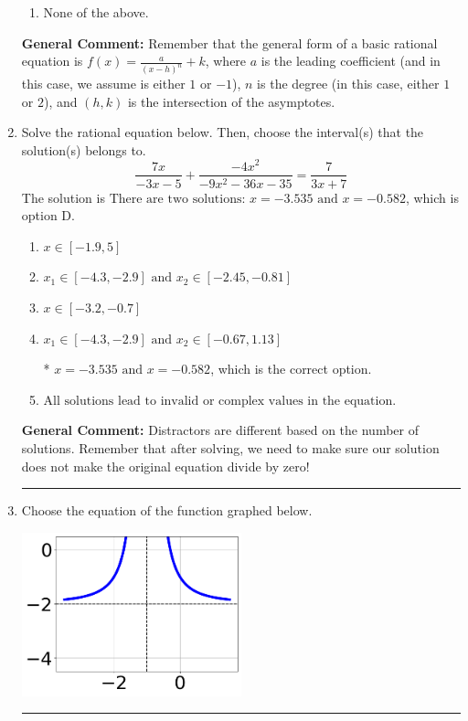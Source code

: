 \documentclass{extbook}[14pt]
\newcommand{\litem}[1]{\item #1

\rule{\textwidth}{0.4pt}}
\begin{document}
\begin{enumerate}
{\begin{enumerate}[label=\Alph*.]
\item None of the above.\end{enumerate}
\textbf{General Comment:} Remember that the general form of a basic rational equation is $ f(x) = \frac{a}{(x-h)^n} + k$, where $a$ is the leading coefficient (and in this case, we assume is either $1$ or $-1$), $n$ is the degree (in this case, either $1$ or $2$), and $(h, k)$ is the intersection of the asymptotes.
}
\litem{
Solve the rational equation below. Then, choose the interval(s) that the solution(s) belongs to.
\[ \frac{7x}{-3x -5} + \frac{-4x^{2}}{-9x^{2} -36 x -35} = \frac{7}{3x + 7} \]The solution is \( \text{There are two solutions: } x = -3.535 \text{ and } x = -0.582 \), which is option D.\begin{enumerate}[label=\Alph*.]
\item \( x \in [-1.9,5] \)


\item \( x_1 \in [-4.3, -2.9] \text{ and } x_2 \in [-2.45,-0.81] \)


\item \( x \in [-3.2,-0.7] \)


\item \( x_1 \in [-4.3, -2.9] \text{ and } x_2 \in [-0.67,1.13] \)

* $x = -3.535 \text{ and } x = -0.582$, which is the correct option.
\item \( \text{All solutions lead to invalid or complex values in the equation.} \)


\end{enumerate}

\textbf{General Comment:} Distractors are different based on the number of solutions. Remember that after solving, we need to make sure our solution does not make the original equation divide by zero!
}
\litem{
Choose the equation of the function graphed below.

\begin{center}
    \includegraphics[width=0.5\textwidth]{../Figures/rationalGraphToEquationC.png}
\end{center}


}
\end{enumerate}
\end{document}
